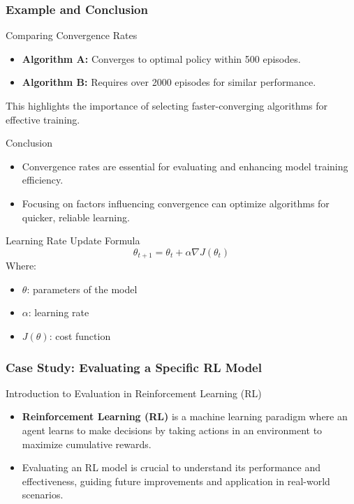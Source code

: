 \documentclass{beamer}
\begin{document}
\begin{frame}[fragile]
    \frametitle{Example and Conclusion}
    \begin{block}{Comparing Convergence Rates}
        \begin{itemize}
            \item \textbf{Algorithm A:} Converges to optimal policy within 500 episodes.
            \item \textbf{Algorithm B:} Requires over 2000 episodes for similar performance.
        \end{itemize}
        This highlights the importance of selecting faster-converging algorithms for effective training.
    \end{block}

    \begin{block}{Conclusion}
        \begin{itemize}
            \item Convergence rates are essential for evaluating and enhancing model training efficiency.
            \item Focusing on factors influencing convergence can optimize algorithms for quicker, reliable learning.
        \end{itemize}
    \end{block}

    \begin{block}{Learning Rate Update Formula}
        \begin{equation}
            \theta_{t+1} = \theta_t + \alpha \nabla J(\theta_t)
        \end{equation}
        Where:
        \begin{itemize}
            \item $\theta$: parameters of the model
            \item $\alpha$: learning rate
            \item $J(\theta)$: cost function
        \end{itemize}
    \end{block}
\end{frame}

\begin{frame}[fragile]
    \frametitle{Case Study: Evaluating a Specific RL Model}
    \begin{block}{Introduction to Evaluation in Reinforcement Learning (RL)}
        \begin{itemize}
            \item \textbf{Reinforcement Learning (RL)} is a machine learning paradigm where an agent learns to make decisions by taking actions in an environment to maximize cumulative rewards.
            \item Evaluating an RL model is crucial to understand its performance and effectiveness, guiding future improvements and application in real-world scenarios.
        \end{itemize}
    \end{block}
\end{frame}
\end{document}
